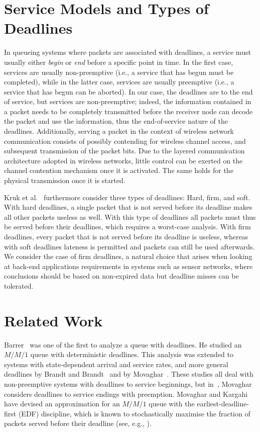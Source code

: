 \documentclass[preprint,12pt]{elsarticle}
\theoremstyle{definition}
\theoremstyle{plain}
\theoremstyle{remark}
\begin{document}
\section{Service Models and Types of Deadlines}\label{section:deadlines}
In queueing systems where packets are associated with deadlines, a service must usually either \emph{begin} or \emph{end} before a specific point in time. In the first case, services are usually non-preemptive (i.e., a service that has begun must be completed), while in the latter case, services are usually preemptive (i.e., a service that has begun can be aborted). In our case, the deadlines are to the end of service, but services are non-preemptive; indeed, the information contained in a packet needs to be completely transmitted before the receiver node can decode the packet and use the information, thus the end-of-service nature of the deadlines. Additionally, serving a packet in the context of wireless network communication consists of possibly contending for wireless channel access, and subsequent transmission of the packet bits. Due to the layered communication architecture adopted in wireless networks, little control can be exerted on the channel contention mechanism once it is activated. The same holds for the physical transmission once it is started.

Kruk et al.~\cite{kruk_edf_heavy_traffic_networks} furthermore consider three types of deadlines: Hard, firm, and soft. With hard deadlines, a single packet that is not served before its deadline makes all other packets useless as well. With this type of deadlines all packets must thus be served before their deadlines, which requires a worst-case analysis. With firm deadlines, every packet that is not served before its deadline is useless, whereas with soft deadlines lateness is permitted and packets can still be used afterwards. We consider the case of firm deadlines, a natural choice that arises when looking at back-end applications requirements in systems such as sensor networks, where conclusions should be based on non-expired data but deadline misses can be tolerated.

\section{Related Work} \label{section:related-works}
Barrer~\cite{Barrer_indifferent_clerks,Barrer_ordered_service} was one of the first to analyze a queue with deadlines. He studied an $M/M/1$ queue with deterministic deadlines. This analysis was extended to systems with state-dependent arrival and service rates, and more general deadlines by Brandt and Brandt~\cite{Brandt_MMs,Brandt_MMs_deadlines} and by Movaghar~\cite{movaghar_beginnings_fifo}. These studies all deal with non-preemptive systems with deadlines to service beginnings, but in~\cite{movaghar_end_fifo}, Movaghar considers deadlines to service endings with preemption. Movaghar and Kargahi~\cite{Kargahi_movaghar,Kargahi_movaghar_edf} have devised an approximation for an $M/M/1$ queue with the earliest-deadline-first (EDF) discipline, which is known to stochastically maximise the fraction of packets served before their deadline (see, e.g., \cite{panwar_towsley_wolf}).
\end{document}
